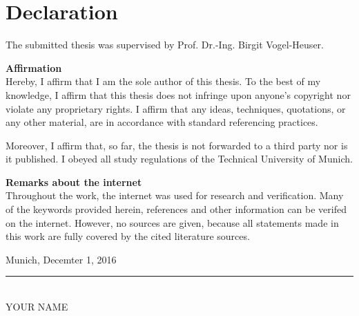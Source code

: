 \chapter*{Declaration}
\thispagestyle{plain}
%
The submitted thesis was supervised by Prof. Dr.-Ing. Birgit Vogel-Heuser.
\vspace{1cm}

\textbf{Affirmation}\\
Hereby, I affirm that I am the sole author of this thesis. To the best of my knowledge, I affirm
that this thesis does not infringe upon anyone's copyright nor violate any proprietary rights.
I affirm that any ideas, techniques, quotations, or any other material, are in accordance with
standard referencing practices.

Moreover, I affirm that, so far, the thesis is not forwarded to a third party nor is it published.
I obeyed all study regulations of the Technical University of Munich.

\vspace{1cm}

\textbf{Remarks about the internet}\\
Throughout the work, the internet was used for research and verification. Many of the
keywords provided herein, references and other information can be verifed on the internet.
However, no sources are given, because all statements made in this work are fully covered by
the cited literature sources.

\vspace*{2.5cm}
\hspace*{1cm} Munich, Decemter 1, 2016
\hspace*{3cm}\rule[-3pt]{5cm}{1pt} \hspace*{2cm}\\
\hspace*{9.3cm} YOUR NAME
